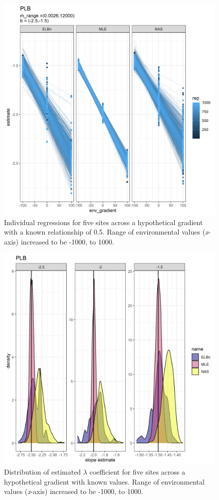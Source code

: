 \documentclass[
]{article}
\begin{document}
\begin{figure}
\centering
\includegraphics{figures/PLB_large_x_main.png}
\caption{Individual regressions for five sites across a hypothetical
gradient with a known relationship of 0.5. Range of environmental values
(\emph{x}-axis) increased to be -1000, to 1000.}
\end{figure}

\begin{figure}
\centering
\includegraphics{figures/PLB_large_x_est_b_density.png}
\caption{Distribution of estimated \(\lambda\) coefficient for five
sites across a hypothetical gradient with known values. Range of
environmental values (\emph{x}-axis) increased to be -1000, to 1000.}
\end{figure}
\end{document}
